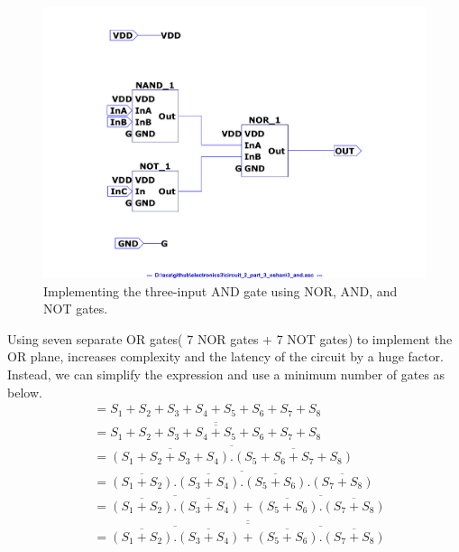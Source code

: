 \documentclass[a4paper,11pt]{article}%
\begin{document}
\begin{figure}[H]
	\centering
	\includegraphics[scale=0.5]{figures/Figure332.pdf}
	\caption{Implementing the three-input AND gate using NOR, AND, and NOT gates.}
\end{figure}

Using seven separate OR gates( 7 NOR gates + 7 NOT gates) to implement the OR plane, increases complexity and the latency of the circuit by a huge factor. Instead, we can simplify the expression and use a minimum number of gates as below.\\

\[
\begin{split}
 & = S_1 + S_2 + S_3 + S_4 + S_5 + S_6 + S_7 + S_8\\
 & = \overline{\overline{S_1 + S_2 + S_3 + S_4 + S_5 + S_6 + S_7 + S_8}}\\
 & = \overline{\overline{\left( S_1 + S_2 + S_3 + S_4 \right)}. \overline{\left( S_5 + S_6 + S_7 + S_8 \right)}}\\
  & = \overline{\overline{\left( S_1 + S_2\right)} .\overline{\left( S_3 + S_4 \right)}. \overline{\left( S_5 + S_6\right)}.  \overline{\left( S_7 + S_8 \right)}}\\
    & = \overline{\overline{\left( S_1 + S_2\right)} .\overline{\left( S_3 + S_4 \right)}}+ \overline{\overline{\left( S_5 + S_6\right)}.  \overline{\left( S_7 + S_8 \right)}}\\
    & = \overline{\overline{ \overline{\overline{\left( S_1 + S_2\right)} .\overline{\left( S_3 + S_4 \right)}}+ \overline{\overline{\left( S_5 + S_6\right)}.  \overline{\left( S_7 + S_8 \right)}} }}
\end{split}
\]
\end{document}
